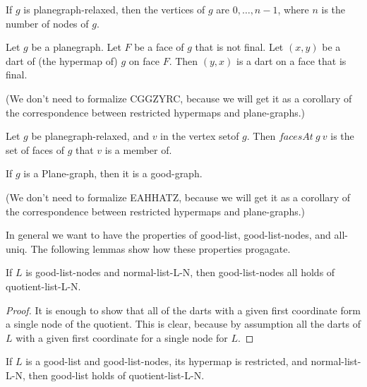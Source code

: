 \begin{lemma}
If $g$ is planegraph-relaxed, then  the vertices of $g$ are $0,\ldots,n-1$, where
$n$ is the number of nodes of $g$. 
\end{lemma} 

\begin{lemma} 
Let $g$ be a planegraph.  Let $F$ be a face of $g$
that is not final.  Let $(x,y)$ be a dart of (the hypermap of) $g$ on face
$F$.
Then $(y,x)$ is a dart on a face that is final.
\end{lemma} 

(We don't need to formalize CGGZYRC, because we will get it as a corollary
of the correspondence between restricted hypermaps and plane-graphs.)

\begin{lemma}
Let $g$ be planegraph-relaxed, and $v$ in the vertex setof $g$.
Then $facesAt~g~v$ is the set of faces of $g$ that $v$ is a member of.
\end{lemma}

\begin{lemma}
If $g$ is a Plane-graph, then it is a good-graph.
\end{lemma}

(We don't need to formalize EAHHATZ, because we will get it as a corollary
of the correspondence between restricted hypermaps and plane-graphs.)

In general we want to have the properties of good-list, good-list-nodes, and all-uniq.
The following lemmas show how these properties progagate.

\begin{lemma}  If $L$ is good-list-nodes and normal-list-L-N, then good-list-nodes
all holds of quotient-list-L-N.
\end{lemma}

\begin{proof}  It is enough to show that all of the darts with a given first coordinate form a single node of the quotient.
This is clear, because by assumption all the darts of $L$ with a given first coordinate for a single node for $L$.
\end{proof}

\begin{lemma}  If $L$ is a good-list and good-list-nodes, its hypermap is restricted,
and normal-list-L-N, then good-list holds of quotient-list-L-N.
\end{lemma}

